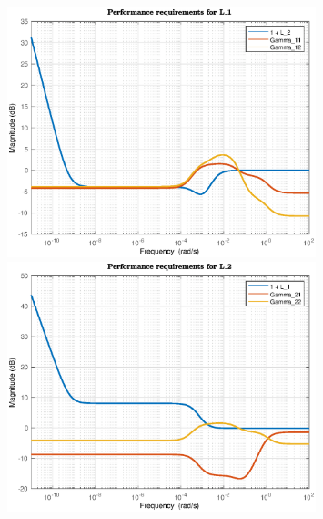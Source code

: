 \documentclass[12pt]{article}
\begin{document}
\begin{figure}[p]
\centering
\includegraphics[width=0.8\textwidth]{../Systemanalyse/Log_Data_to_Matlab/Figurer/LV_identifisering/L1_krav_P-reg.eps}
\caption{}
\label{fig:L1_performance1}

\includegraphics[width=0.8\textwidth]{../Systemanalyse/Log_Data_to_Matlab/Figurer/LV_identifisering/L2_krav_P-reg.eps}
\caption{}
\label{fig:L2_performance1}
\end{figure}
\end{document}
